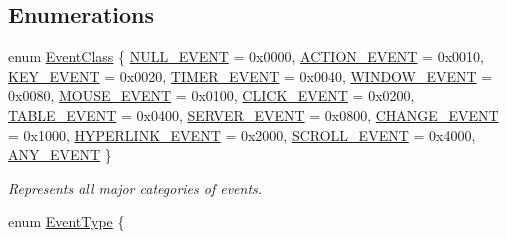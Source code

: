 \subsection*{Enumerations}
\begin{DoxyCompactItemize}
\item 
enum \mbox{\hyperlink{namespacesgl_a6ff6e8ee75a08092e30167b2b7c5d6f7}{Event\+Class}} \{ \mbox{\hyperlink{namespacesgl_a6ff6e8ee75a08092e30167b2b7c5d6f7ad986036666e3b6f3a053e2b1f43c1495}{N\+U\+L\+L\+\_\+\+E\+V\+E\+NT}} = 0x0000, 
\mbox{\hyperlink{namespacesgl_a6ff6e8ee75a08092e30167b2b7c5d6f7a634eae33a5625896fb81c91764abd0a3}{A\+C\+T\+I\+O\+N\+\_\+\+E\+V\+E\+NT}} = 0x0010, 
\mbox{\hyperlink{namespacesgl_a6ff6e8ee75a08092e30167b2b7c5d6f7a0e6d8d51cdea5a4ed106568ba7637ad2}{K\+E\+Y\+\_\+\+E\+V\+E\+NT}} = 0x0020, 
\mbox{\hyperlink{namespacesgl_a6ff6e8ee75a08092e30167b2b7c5d6f7a3f61e65d6aa7a42e57475938ed168703}{T\+I\+M\+E\+R\+\_\+\+E\+V\+E\+NT}} = 0x0040, 
\mbox{\hyperlink{namespacesgl_a6ff6e8ee75a08092e30167b2b7c5d6f7aa4096c3f263085a0c8d4f12f3265f44d}{W\+I\+N\+D\+O\+W\+\_\+\+E\+V\+E\+NT}} = 0x0080, 
\mbox{\hyperlink{namespacesgl_a6ff6e8ee75a08092e30167b2b7c5d6f7a3cf923d175a341bbb622032a7c54a3de}{M\+O\+U\+S\+E\+\_\+\+E\+V\+E\+NT}} = 0x0100, 
\mbox{\hyperlink{namespacesgl_a6ff6e8ee75a08092e30167b2b7c5d6f7a7df24d047177fdf5f5e859fe26a0d264}{C\+L\+I\+C\+K\+\_\+\+E\+V\+E\+NT}} = 0x0200, 
\mbox{\hyperlink{namespacesgl_a6ff6e8ee75a08092e30167b2b7c5d6f7accb622f830cee817e0c822c3b09effc5}{T\+A\+B\+L\+E\+\_\+\+E\+V\+E\+NT}} = 0x0400, 
\mbox{\hyperlink{namespacesgl_a6ff6e8ee75a08092e30167b2b7c5d6f7a1372abe3572d02cdfb11fee1009c4f94}{S\+E\+R\+V\+E\+R\+\_\+\+E\+V\+E\+NT}} = 0x0800, 
\mbox{\hyperlink{namespacesgl_a6ff6e8ee75a08092e30167b2b7c5d6f7a4a6926955fe76351a4b0426a59c44cea}{C\+H\+A\+N\+G\+E\+\_\+\+E\+V\+E\+NT}} = 0x1000, 
\mbox{\hyperlink{namespacesgl_a6ff6e8ee75a08092e30167b2b7c5d6f7a317abdcdad9bf2f915b8832e237c8ba7}{H\+Y\+P\+E\+R\+L\+I\+N\+K\+\_\+\+E\+V\+E\+NT}} = 0x2000, 
\mbox{\hyperlink{namespacesgl_a6ff6e8ee75a08092e30167b2b7c5d6f7adf4e86b54811eb2f84688c021d758afd}{S\+C\+R\+O\+L\+L\+\_\+\+E\+V\+E\+NT}} = 0x4000, 
\mbox{\hyperlink{namespacesgl_a6ff6e8ee75a08092e30167b2b7c5d6f7adb39e2dc0584d3e28dad8abaa4b926b7}{A\+N\+Y\+\_\+\+E\+V\+E\+NT}}
 \}
\begin{DoxyCompactList}\small\item\em Represents all major categories of events. \end{DoxyCompactList}\item 
enum \mbox{\hyperlink{namespacesgl_a2628ea8d12e8b2563c32f05dc7fff6fa}{Event\+Type}} \{ \newline

\end{DoxyCompactItemize}
